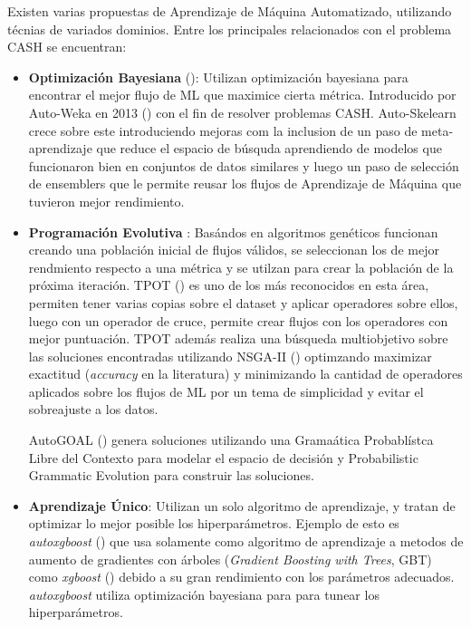 
Existen varias propuestas de Aprendizaje de M\'aquina Automatizado, utilizando t\'ecnias de variados dominios. Entre los principales relacionados con el problema CASH se encuentran:
\begin{itemize}
    \item \textbf{Optimizaci\'on Bayesiana} (\cite{hutter2019automated}): Utilizan optimizaci\'on bayesiana para encontrar el mejor flujo de ML que maximice cierta m\'etrica. Introducido por Auto-Weka en 2013 (\cite{thornton2013auto}) con el fin de resolver problemas CASH. Auto-Skelearn \cite{feurer2015efficient} crece sobre este introduciendo mejoras com la inclusion de un paso de meta-aprendizaje que reduce el espacio de b\'usquda aprendiendo de modelos que funcionaron bien en conjuntos de datos similares y luego un paso de selecci\'on de ensemblers que le permite reusar los flujos de Aprendizaje de M\'aquina que tuvieron mejor rendimiento.
    
    \item \textbf{Programaci\'on Evolutiva} \cite{chen2018autostacker}: Bas\'andos en algoritmos gen\'eticos funcionan creando una poblaci\'on inicial de flujos v\'alidos, se seleccionan los de mejor rendmiento respecto a una m\'etrica y se utilzan para crear la poblaci\'on de la pr\'oxima iteraci\'on. TPOT (\cite{pmlr-v64-olson_tpot_2016}) es uno de los m\'as reconocidos en esta \'area, permiten tener varias copias sobre el dataset y aplicar operadores sobre ellos, luego con un operador de cruce, permite crear flujos con los operadores con mejor puntuaci\'on. TPOT adem\'as realiza una b\'usqueda multiobjetivo sobre las soluciones encontradas utilizando NSGA-II (\cite{deb2002fast}) optimzando maximizar exactitud (\textit{accuracy} en la literatura) y minimizando la cantidad de operadores aplicados sobre los flujos de ML por un tema de simplicidad y evitar el sobreajuste a los datos.

        AutoGOAL (\cite{estevez2020solving}) genera soluciones utilizando una Grama\'atica Probabl\'istca Libre del Contexto para modelar el espacio de decisi\'on y Probabilistic Grammatic Evolution para construir las soluciones.

    \item \textbf{Aprendizaje \'Unico}: Utilizan un solo algoritmo de aprendizaje, y tratan de optimizar lo mejor posible los hiperpar\'ametros. Ejemplo de esto es \textit{autoxgboost} (\cite{thomas2018automatic}) que usa solamente como algoritmo de aprendizaje a metodos de aumento de gradientes con \'arboles (\textit{Gradient Boosting with Trees}, GBT) como \textit{xgboost} (\cite{chen2016xgboost}) debido a su gran rendimiento con los par\'ametros adecuados. \textit{autoxgboost} utiliza optimizaci\'on bayesiana para para tunear los hiperpar\'ametros.
    
\end{itemize}

